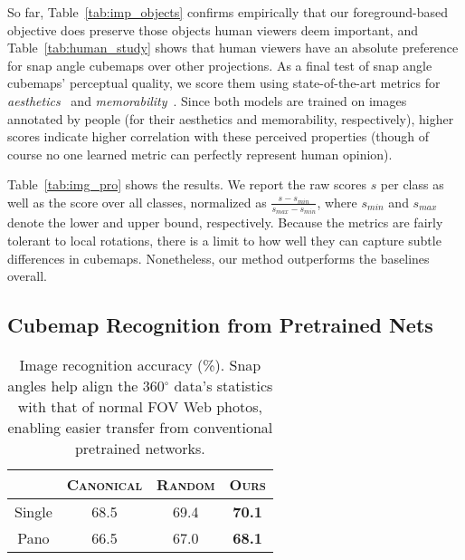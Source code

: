 So far, Table~\ref{tab:imp_objects} confirms empirically that our foreground-based objective does preserve those objects human viewers deem important, and Table~\ref{tab:human_study} shows that human viewers have an absolute preference for snap angle cubemaps over other projections. 
As a final test of snap angle cubemaps' perceptual quality, we score them using state-of-the-art metrics for \emph{aesthetics}~\cite{kong2016aesthetics} and \emph{memorability}~\cite{ICCV15_Khosla}.
Since both models are trained on images annotated by people (for their aesthetics and memorability, respectively), higher scores indicate higher correlation with these perceived properties (though of course no one learned metric can perfectly represent human opinion).

Table~\ref{tab:img_pro} shows the results.
We report the raw scores $s$ per class as well as the score over all classes, normalized as $\frac{s-s_{min}}{s_{max}-s_{min}}$, where $s_{min}$ and $s_{max}$ denote the lower and upper bound, respectively.
Because the metrics are fairly tolerant to local rotations, there is a limit to how well they can capture subtle differences in cubemaps.  Nonetheless, our method outperforms the baselines overall. 







\vspace{-5pt}


\subsection{Cubemap Recognition from Pretrained Nets}\label{sec:recognition}







\begin{table}[t]\centering
\begin{tabular}{c|ccc}\toprule
 &   \textsc{Canonical}   &   \textsc{Random}       &   \textsc{Ours} \\ \midrule
Single  &   68.5       & 69.4         &  \textbf{70.1}        \\
Pano    &   66.5       & 67.0         & \textbf{ 68.1}         \\
\bottomrule
\end{tabular}
\vspace{4pt}
\caption{Image recognition accuracy (\%). Snap angles help align the 360$^{\circ}$ data's statistics with that of normal FOV Web photos, enabling easier transfer from conventional pretrained networks.}
\label{tab:reg_google}
\vspace{-25pt}
\end{table}





